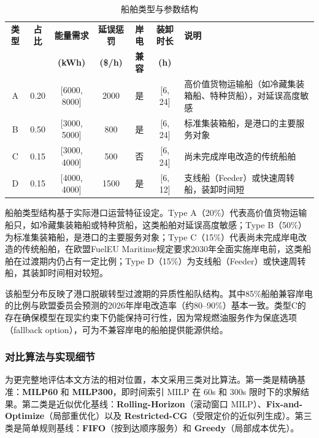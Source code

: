 \documentclass[UTF8, a4paper, 12pt]{ctexart}
\begin{document}
\begin{table}[htbp]
    \centering
    \caption{船舶类型与参数结构}
    \label{tab:ship_types}
    \footnotesize
    \renewcommand{\arraystretch}{1.3}
    \begin{threeparttable}
    \begin{tabular}{c c c c c c p{4cm}}
        \toprule
        \textbf{类型} & \textbf{占比} & \textbf{能量需求} & \textbf{延误惩罚} & \textbf{岸电} & \textbf{装卸时长} & \textbf{说明} \\
        & & \textbf{(kWh)} & \textbf{(\$/h)} & \textbf{兼容} & \textbf{(h)} & \\
        \midrule
        A & 0.20 & [6000, 8000] & 2000 & 是 & [6, 24] & 高价值货物运输船（如冷藏集装箱船、特种货船），对延误高度敏感 \\
        \addlinespace
        B & 0.50 & [3000, 5000] & 800 & 是 & [6, 24] & 标准集装箱船，是港口的主要服务对象 \\
        \addlinespace
        C & 0.15 & [3000, 4000] & 500 & 否 & [6, 24] & 尚未完成岸电改造的传统船舶 \\
        \addlinespace
        D & 0.15 & [4000, 4000] & 1500 & 是 & [6, 12] & 支线船（Feeder）或快速周转船，装卸时间短 \\
        \bottomrule
    \end{tabular}
    \end{threeparttable}
\end{table}

船舶类型结构基于实际港口运营特征设定。Type A（20\%）代表高价值货物运输船只，如冷藏集装箱船或特种货船，这类船舶对延误高度敏感；Type B（50\%）为标准集装箱船，是港口的主要服务对象；Type C（15\%）代表尚未完成岸电改造的传统船舶，在欧盟FuelEU Maritime规定\cite{EU2025}要求2030年全面实施岸电前，这类船舶在过渡期内仍占有一定比例；Type D（15\%）为支线船（Feeder）或快速周转船，其装卸时间相对较短。

该船型分布反映了港口脱碳转型过渡期的异质性船队结构。其中85\%船舶兼容岸电的比例与欧盟委员会预测的2026年岸电改造率（约80--90\%）基本一致。类型C的存在确保模型在现实约束下仍能保持可行性，因为常规燃油服务作为保底选项（fallback option），可为不兼容岸电的船舶提供能源供给。

\subsubsection{对比算法与实现细节}
\label{sec:baselines_impl}
为更完整地评估本文方法的相对位置，本文采用三类对比算法。第一类是精确基准：\textbf{MILP60} 和 \textbf{MILP300}，即时间索引 MILP 在 60s 和 300s 限时下的求解结果。第二类是近似优化基线：\textbf{Rolling-Horizon}（滚动窗口 MILP）、\textbf{Fix-and-Optimize}（局部重优化）以及 \textbf{Restricted-CG}（受限定价的近似列生成）。第三类是简单规则基线：\textbf{FIFO}（按到达顺序服务）和 \textbf{Greedy}（局部成本优先）。
\end{document}
